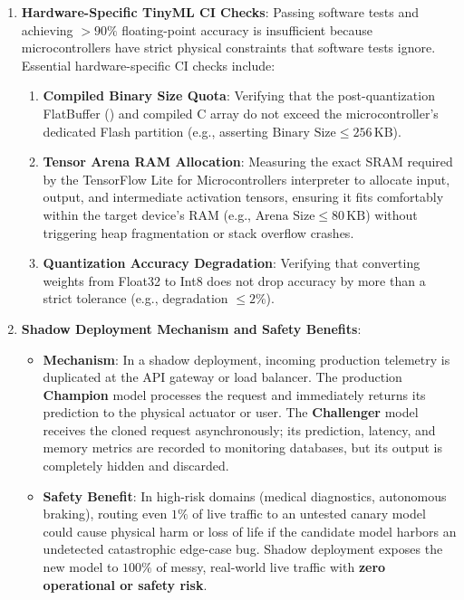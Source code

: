 \begin{enumerate}
    \item \textbf{Hardware-Specific TinyML CI Checks}:
    Passing software tests and achieving $> 90\%$ floating-point accuracy is insufficient because microcontrollers have strict physical constraints that software tests ignore. Essential hardware-specific CI checks include:
    \begin{enumerate}
        \item \textbf{Compiled Binary Size Quota}: Verifying that the post-quantization FlatBuffer () and compiled C array do not exceed the microcontroller's dedicated Flash partition (e.g., asserting $\text{Binary Size} \le 256\,\text{KB}$).
        \item \textbf{Tensor Arena RAM Allocation}: Measuring the exact SRAM required by the TensorFlow Lite for Microcontrollers interpreter to allocate input, output, and intermediate activation tensors, ensuring it fits comfortably within the target device's RAM (e.g., $\text{Arena Size} \le 80\,\text{KB}$) without triggering heap fragmentation or stack overflow crashes.
        \item \textbf{Quantization Accuracy Degradation}: Verifying that converting weights from Float32 to Int8 does not drop accuracy by more than a strict tolerance (e.g., degradation $\le 2\%$).
    \end{enumerate}

    \item \textbf{Shadow Deployment Mechanism and Safety Benefits}:
    \begin{itemize}
        \item \textbf{Mechanism}: In a shadow deployment, incoming production telemetry is duplicated at the API gateway or load balancer. The production \textbf{Champion} model processes the request and immediately returns its prediction to the physical actuator or user. The \textbf{Challenger} model receives the cloned request asynchronously; its prediction, latency, and memory metrics are recorded to monitoring databases, but its output is completely hidden and discarded.
        \item \textbf{Safety Benefit}: In high-risk domains (medical diagnostics, autonomous braking), routing even $1\%$ of live traffic to an untested canary model could cause physical harm or loss of life if the candidate model harbors an undetected catastrophic edge-case bug. Shadow deployment exposes the new model to $100\%$ of messy, real-world live traffic with \textbf{zero operational or safety risk}.
    \end{itemize}
\end{enumerate}